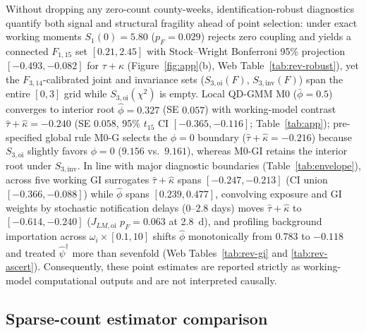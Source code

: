 Without dropping any zero-count county-weeks, identification-robust diagnostics quantify both signal
and structural fragility ahead of point selection: under exact working moments $S_1(0)=5.80$
($p_F=0.029$) rejects zero coupling and yields a connected $F_{1,15}$ set $[0.21,2.45]$ with
Stock--Wright Bonferroni 95\% projection $[-0.493,-0.082]$ for $\tau+\kappa$
(Figure~\ref{fig:app}(b), Web Table~\ref{tab:rev-robust}), yet the $F_{3,14}$-calibrated joint and
invariance sets ($S_{3,\mathrm{oi}}(F)$, $S_{3,\mathrm{inv}}(F)$) span the entire $[0,3]$ grid
while $S_{3,\mathrm{oi}}(\chi^2)$ is empty. Local QD-GMM M0 ($\bar\phi=0.5$) converges to interior
root $\hat\phi=0.327$ (SE $0.057$) with working-model contrast $\hat\tau+\hat\kappa=-0.240$ (SE
$0.058$, 95\% $t_{15}$ CI $[-0.365,-0.116]$; Table~\ref{tab:app}); pre-specified global rule M0-G
selects the $\phi=0$ boundary ($\hat\tau+\hat\kappa=-0.216$) because $S_{3,\mathrm{oi}}$ slightly
favors $\phi=0$ ($9.156$ vs.\ $9.161$), whereas M0-GI retains the interior root under
$S_{3,\mathrm{inv}}$. In line with major diagnostic boundaries (Table~\ref{tab:envelope}), across
five working GI surrogates $\hat\tau+\hat\kappa$ spans $[-0.247,-0.213]$ (CI union
$[-0.366,-0.088]$) while $\hat\phi$ spans $[0.239,0.477]$, convolving exposure and GI weights by
stochastic notification delays ($0$--$2.8$ days) moves $\hat\tau+\hat\kappa$ to $[-0.614,-0.240]$
($J_{LM,\mathrm{oi}}$ $p_F=0.063$ at 2.8~d), and profiling background importation across
$\omega_i\times[0.1,10]$ shifts $\hat\phi$ monotonically from $0.783$ to $-0.118$ and treated
$\hat\psi^\dagger$ more than sevenfold (Web Tables~\ref{tab:rev-gi} and \ref{tab:rev-ascert}).
Consequently, these point estimates are reported strictly as working-model computational outputs and
are not interpreted causally.

\subsection{Sparse-count estimator comparison}
\label{ss:app-comp}

